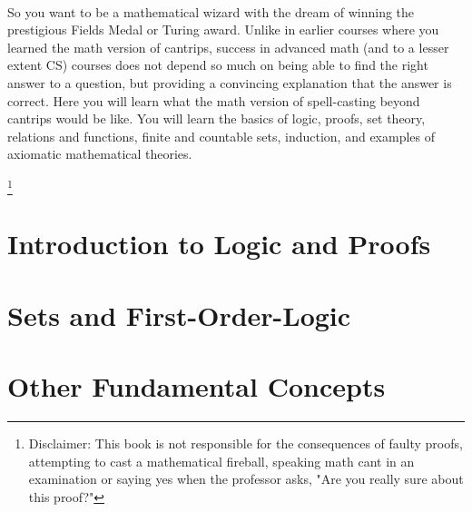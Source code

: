 \documentclass[letterpaper,10pt,twoside,twocolumn,openany]{book}
\begin{document}
\frontmatter                           
\begin{titlepage}
    ~
    \newpage
    
    \begin{center}
        

        \large
        \vspace*{\fill}
        So you want to be a mathematical wizard with the dream of winning the prestigious Fields Medal or Turing award. Unlike in earlier courses where you learned the math version of cantrips, success in advanced math (and to a lesser extent CS) courses does not depend so much on being able to find the right answer to a question, but providing a convincing explanation that the answer is correct. Here you will learn what the math version of spell-casting beyond cantrips would be like. You will learn the basics of logic, proofs, set theory, relations and functions, finite and countable sets, induction, and examples of axiomatic mathematical theories.
        \vspace*{\fill}

    \end{center}
    \let\thefootnote\relax\footnote{Disclaimer: This book is not responsible for the consequences of faulty proofs, attempting to cast a mathematical fireball, speaking math cant in an examination or saying yes when the professor asks, "Are you really sure about this proof?" }
\end{titlepage}
\tableofcontents
\mainmatter
\part{Introduction to Logic and Proofs}


\part{Sets and First-Order-Logic}



\part{Other Fundamental Concepts}





\end{document}
